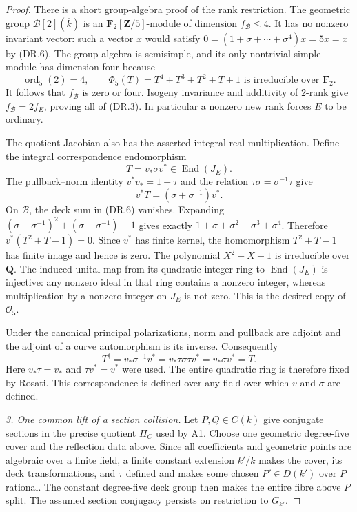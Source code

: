 \begin{proof}
There is a short group-algebra proof of the rank restriction.  The
geometric group $\mathcal B[2](\overline k)$ is an
$\mathbf F_2[\mathbf Z/5]$-module of dimension $f_{\mathcal B}\le4$.
It has no nonzero invariant vector: such a vector $x$ would satisfy
$0=(1+\sigma+\cdots+\sigma^4)x=5x=x$ by (DR.6).
The group algebra is semisimple, and its only nontrivial simple module
has dimension four because
\[
             \operatorname{ord}_5(2)=4,
             \qquad \Phi_5(T)=T^4+T^3+T^2+T+1
             \text{ is irreducible over }\mathbf F_2.
 \tag{DR.7}
\]
It follows that $f_{\mathcal B}$ is zero or four.  Isogeny invariance
and additivity of $2$-rank give $f_{\mathcal B}=2f_E$, proving all of
(DR.3).  In particular a nonzero new rank forces $E$ to be ordinary.

The quotient Jacobian also has the asserted integral real
multiplication.  Define the integral correspondence endomorphism
\[
                   T=v_*\sigma v^*\in\operatorname{End}(J_E).
 \tag{DR.7a}
\]
The pullback--norm identity $v^*v_*=1+\tau$ and the relation
$\tau\sigma=\sigma^{-1}\tau$ give
\[
            v^*T=(\sigma+\sigma^{-1})v^*.
 \tag{DR.7b}
\]
On $\mathcal B$, the deck sum in (DR.6) vanishes.  Expanding
$(\sigma+\sigma^{-1})^2+(\sigma+\sigma^{-1})-1$ gives exactly
$1+\sigma+\sigma^2+\sigma^3+\sigma^4$.  Therefore
$v^*(T^2+T-1)=0$.  Since $v^*$ has finite kernel, the homomorphism
$T^2+T-1$ has finite image and hence is zero.  The polynomial
$X^2+X-1$ is irreducible over $\mathbf Q$.  The induced unital map
from its quadratic integer ring to $\operatorname{End}(J_E)$ is
injective: any nonzero ideal in that ring contains a nonzero integer,
whereas multiplication by a nonzero integer on $J_E$ is not zero.
This is the desired copy of $\mathcal O_5$.

Under the canonical principal polarizations, norm and pullback are
adjoint and the adjoint of a curve automorphism is its inverse.
Consequently
\[
 T^{\dagger}=v_*\sigma^{-1}v^*
            =v_*\tau\sigma\tau v^*=v_*\sigma v^*=T.
 \tag{DR.7c}
\]
Here $v_*\tau=v_*$ and $\tau v^*=v^*$ were used.  The entire
quadratic ring is therefore fixed by Rosati.  This correspondence is
defined over any field over which $v$ and $\sigma$ are defined.

\emph{3. One common lift of a section collision.}
Let $P,Q\in C(k)$ give conjugate sections in the precise quotient
$\Pi_C$ used by A1.  Choose one geometric degree-five cover and the
reflection data above.  Since all coefficients and geometric points
are algebraic over a finite field, a finite constant extension $k'/k$
makes the cover, its deck transformations, and $\tau$ defined and makes
some chosen $P'\in D(k')$ over $P$ rational.  The constant degree-five
deck group then makes the entire fibre above $P$ split.  The assumed
section conjugacy persists on restriction to $G_{k'}$.


\end{proof}
